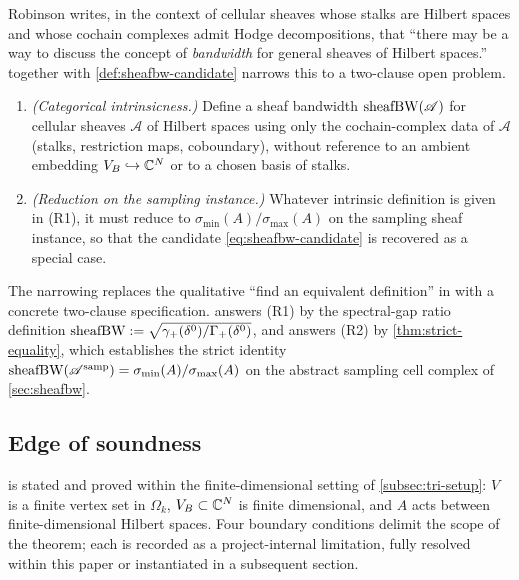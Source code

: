 Robinson \cite[\S 6]{Robinson2014} writes, in the context of cellular
sheaves whose stalks are Hilbert spaces and whose cochain complexes
admit Hodge decompositions, that ``there may be a way to discuss the
concept of \emph{bandwidth} for general sheaves of Hilbert spaces.''
 together with \cref{def:sheafbw-candidate}
narrows this to a two-clause open problem.

\begin{enumerate}
  \item[\textup{(R1)}] \emph{(Categorical intrinsicness.)} Define a
        sheaf bandwidth $\operatorname{sheafBW}(\mathscr{A})$ for cellular sheaves
        $\mathscr{A}$ of Hilbert spaces using only the cochain-complex
        data of $\mathscr{A}$ (stalks, restriction maps, coboundary),
        without reference to an ambient embedding
        $V_B \hookrightarrow \mathbb{C}^N$ or to a chosen basis of stalks.
  \item[\textup{(R2)}] \emph{(Reduction on the sampling instance.)}
        Whatever intrinsic definition is given in \textup{(R1)}, it
        must reduce to $\sigma_{\min}(A) / \sigma_{\max}(A)$ on the
        sampling sheaf instance, so that the candidate
        \cref{eq:sheafbw-candidate} is recovered as a special case.
\end{enumerate}

The narrowing replaces the qualitative ``find an equivalent
definition'' in \cite[\S 6]{Robinson2014} with a concrete two-clause
specification.  answers \textup{(R1)} by the
spectral-gap ratio definition
$\operatorname{sheafBW} := \sqrt{\gamma_+(\delta^0) / \Gamma_+(\delta^0)}$, and
answers \textup{(R2)} by \cref{thm:strict-equality}, which establishes
the strict identity
$\operatorname{sheafBW}(\mathscr{A}^{\mathrm{samp}}) = \sigma_{\min}(A) / \sigma_{\max}(A)$ on the
abstract sampling cell complex of \cref{sec:sheafbw}.

\subsection{Edge of soundness}\label{subsec:tri-edge}

 is stated and proved within the
finite-dimensional setting of \cref{subsec:tri-setup}: $V$ is a
finite vertex set in $\Omega_k$, $V_B \subset \mathbb{C}^N$ is finite
dimensional, and $A$ acts between finite-dimensional Hilbert spaces.
Four boundary conditions delimit the scope of the theorem; each is
recorded as a project-internal limitation, fully resolved within
this paper or instantiated in a subsequent section.

